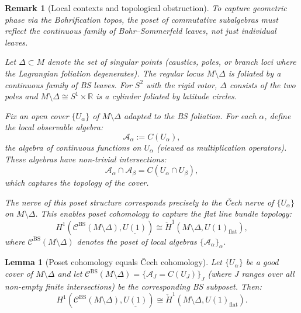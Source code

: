 \documentclass[11pt]{article}
\newtheorem{lemma}[theorem]{Lemma}
\newtheorem{remark}[theorem]{Remark}
\begin{document}
\begin{remark}[Local contexts and topological obstruction]
\label{rem:local-contexts}
To capture geometric phase via the Bohrification topos, the poset of
commutative subalgebras must reflect the \emph{continuous family} of
Bohr--Sommerfeld leaves, not just individual leaves.

Let $\Delta \subset M$ denote the set of singular points (caustics,
poles, or branch loci where the Lagrangian foliation degenerates).
The \emph{regular locus} $M \setminus \Delta$ is foliated by a
continuous family of BS leaves. For $S^2$ with the rigid rotor,
$\Delta$ consists of the two poles and $M \setminus \Delta \cong S^1 \times \mathbb{R}$
is a cylinder foliated by latitude circles.

Fix an open cover $\{U_\alpha\}$ of $M \setminus \Delta$ adapted to
the BS foliation. For each $\alpha$, define the \emph{local observable algebra}:
\[
  \mathcal{A}_\alpha := C(U_\alpha),
\]
the algebra of continuous functions on $U_\alpha$ (viewed as multiplication
operators). These algebras have non-trivial intersections:
\[
  \mathcal{A}_\alpha \cap \mathcal{A}_\beta = C(U_\alpha \cap U_\beta),
\]
which captures the topology of the cover.

The nerve of this poset structure corresponds precisely to the \v{C}ech nerve
of $\{U_\alpha\}$ on $M \setminus \Delta$. This enables poset cohomology
to capture the \emph{flat line bundle} topology:
\[
  H^1(\mathcal{C}^{\mathrm{BS}}(M \setminus \Delta), \underline{U(1)})
  \cong \check{H}^1(M \setminus \Delta, U(1)_{\mathrm{flat}}),
\]
where $\mathcal{C}^{\mathrm{BS}}(M \setminus \Delta)$ denotes the poset
of local algebras $\{\mathcal{A}_\alpha\}_\alpha$.
\end{remark}

\begin{lemma}[Poset cohomology equals \v{C}ech cohomology]
\label{lem:poset-cech}
Let $\{U_\alpha\}$ be a good cover of $M \setminus \Delta$ and let
$\mathcal{C}^{\mathrm{BS}}(M \setminus \Delta) = \{\mathcal{A}_J = C(U_J)\}_J$
(where $J$ ranges over all non-empty finite intersections)
be the corresponding BS subposet. Then:
\[
H^1(\mathcal{C}^{\mathrm{BS}}(M \setminus \Delta), \underline{U(1)})
\cong \check{H}^1(M \setminus \Delta, U(1)_{\mathrm{flat}}).
\]
\end{lemma}
\end{document}
